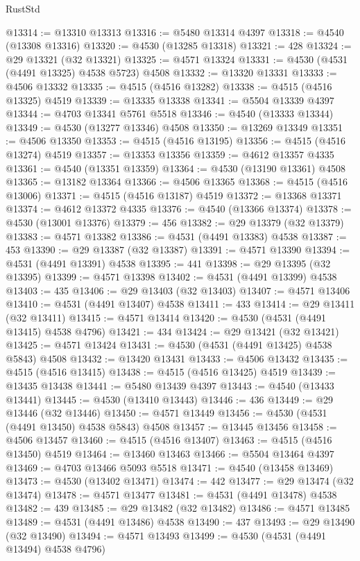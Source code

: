 \begin{lexlean}{RustStd}
\begin{coremodule}
@13314 := @13310 @13313
@13316 := @5480 @13314 @4397
@13318 := @4540 (@13308 @13316)
@13320 := @4530 (@13285 @13318)
@13321 := 428
@13324 := @29 @13321 (@32 @13321)
@13325 := @4571 @13324
@13331 := @4530 (@4531 (@4491 @13325) @4538 @5723) @4508
@13332 := @13320 @13331
@13333 := @4506 @13332
@13335 := @4515 (@4516 @13282)
@13338 := @4515 (@4516 @13325) @4519
@13339 := @13335 @13338
@13341 := @5504 @13339 @4397
@13344 := @4703 @13341 @5761 @5518
@13346 := @4540 (@13333 @13344)
@13349 := @4530 (@13277 @13346) @4508
@13350 := @13269 @13349
@13351 := @4506 @13350
@13353 := @4515 (@4516 @13195)
@13356 := @4515 (@4516 @13274) @4519
@13357 := @13353 @13356
@13359 := @4612 @13357 @4335
@13361 := @4540 (@13351 @13359)
@13364 := @4530 (@13190 @13361) @4508
@13365 := @13182 @13364
@13366 := @4506 @13365
@13368 := @4515 (@4516 @13006)
@13371 := @4515 (@4516 @13187) @4519
@13372 := @13368 @13371
@13374 := @4612 @13372 @4335
@13376 := @4540 (@13366 @13374)
@13378 := @4530 (@13001 @13376)
@13379 := 456
@13382 := @29 @13379 (@32 @13379)
@13383 := @4571 @13382
@13386 := @4531 (@4491 @13383) @4538
@13387 := 453
@13390 := @29 @13387 (@32 @13387)
@13391 := @4571 @13390
@13394 := @4531 (@4491 @13391) @4538
@13395 := 441
@13398 := @29 @13395 (@32 @13395)
@13399 := @4571 @13398
@13402 := @4531 (@4491 @13399) @4538
@13403 := 435
@13406 := @29 @13403 (@32 @13403)
@13407 := @4571 @13406
@13410 := @4531 (@4491 @13407) @4538
@13411 := 433
@13414 := @29 @13411 (@32 @13411)
@13415 := @4571 @13414
@13420 := @4530 (@4531 (@4491 @13415) @4538 @4796)
@13421 := 434
@13424 := @29 @13421 (@32 @13421)
@13425 := @4571 @13424
@13431 := @4530 (@4531 (@4491 @13425) @4538 @5843) @4508
@13432 := @13420 @13431
@13433 := @4506 @13432
@13435 := @4515 (@4516 @13415)
@13438 := @4515 (@4516 @13425) @4519
@13439 := @13435 @13438
@13441 := @5480 @13439 @4397
@13443 := @4540 (@13433 @13441)
@13445 := @4530 (@13410 @13443)
@13446 := 436
@13449 := @29 @13446 (@32 @13446)
@13450 := @4571 @13449
@13456 := @4530 (@4531 (@4491 @13450) @4538 @5843) @4508
@13457 := @13445 @13456
@13458 := @4506 @13457
@13460 := @4515 (@4516 @13407)
@13463 := @4515 (@4516 @13450) @4519
@13464 := @13460 @13463
@13466 := @5504 @13464 @4397
@13469 := @4703 @13466 @5093 @5518
@13471 := @4540 (@13458 @13469)
@13473 := @4530 (@13402 @13471)
@13474 := 442
@13477 := @29 @13474 (@32 @13474)
@13478 := @4571 @13477
@13481 := @4531 (@4491 @13478) @4538
@13482 := 439
@13485 := @29 @13482 (@32 @13482)
@13486 := @4571 @13485
@13489 := @4531 (@4491 @13486) @4538
@13490 := 437
@13493 := @29 @13490 (@32 @13490)
@13494 := @4571 @13493
@13499 := @4530 (@4531 (@4491 @13494) @4538 @4796)

\end{coremodule}
\end{lexlean}
